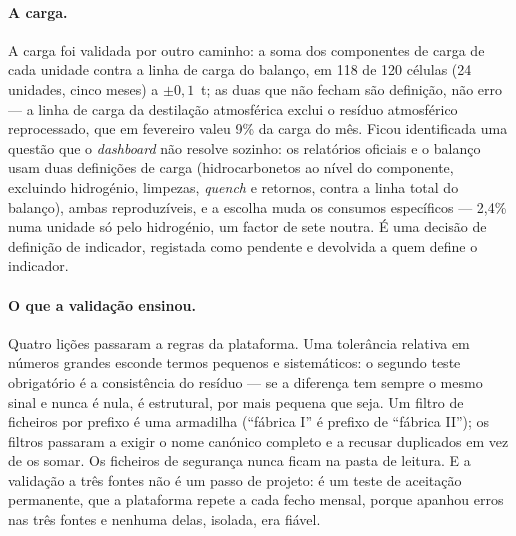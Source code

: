 \paragraph{A carga.} A carga foi validada por outro caminho: a soma dos
componentes de carga de cada unidade contra a linha de carga do balanço,
em 118 de 120 células (24 unidades, cinco meses) a $\pm0{,}1$~t; as duas
que não fecham são definição, não erro --- a linha de carga da destilação
atmosférica exclui o resíduo atmosférico reprocessado, que em fevereiro
valeu 9\% da carga do mês. Ficou identificada uma questão que o
\emph{dashboard} não resolve sozinho: os relatórios oficiais e o balanço
usam duas definições de carga (hidrocarbonetos ao nível do componente,
excluindo hidrogénio, limpezas, \emph{quench} e retornos, contra a linha
total do balanço), ambas reproduzíveis, e a escolha muda os consumos
específicos --- 2,4\% numa unidade só pelo hidrogénio, um factor de sete
noutra. É uma decisão de definição de indicador, registada como pendente
e devolvida a quem define o indicador.

\paragraph{O que a validação ensinou.} Quatro lições passaram a regras
da plataforma. Uma tolerância relativa em números grandes esconde termos
pequenos e sistemáticos: o segundo teste obrigatório é a consistência do
resíduo --- se a diferença tem sempre o mesmo sinal e nunca é nula, é
estrutural, por mais pequena que seja. Um filtro de ficheiros por prefixo
é uma armadilha (``fábrica I'' é prefixo de ``fábrica II''); os filtros
passaram a exigir o nome canónico completo e a recusar duplicados em vez
de os somar. Os ficheiros de segurança nunca ficam na pasta de leitura. E
a validação a três fontes não é um passo de projeto: é um teste de
aceitação permanente, que a plataforma repete a cada fecho mensal, porque
apanhou erros nas três fontes e nenhuma delas, isolada, era fiável.

